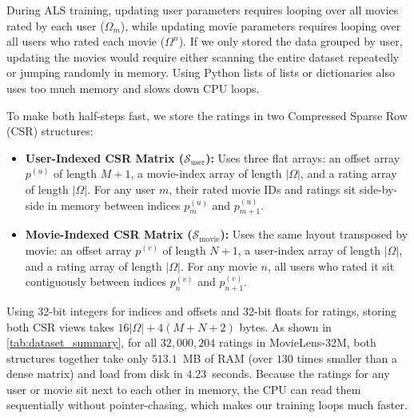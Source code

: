 \documentclass{article}
\theoremstyle{plain}
\theoremstyle{definition}
\begin{document}
During ALS training, updating user parameters requires looping over all movies rated by each user ($\Omega_m$), while updating movie parameters requires looping over all users who rated each movie ($\Omega^n$). If we only stored the data grouped by user, updating the movies would require either scanning the entire dataset repeatedly or jumping randomly in memory. Using Python lists of lists or dictionaries also uses too much memory and slows down CPU loops.

To make both half-steps fast, we store the ratings in two Compressed Sparse Row (CSR) structures:
\begin{itemize}
    \item \textbf{User-Indexed CSR Matrix ($\mathcal{S}_{\text{user}}$):} Uses three flat arrays: an offset array $p^{(u)}$ of length $M+1$, a movie-index array of length $|\Omega|$, and a rating array of length $|\Omega|$. For any user $m$, their rated movie IDs and ratings sit side-by-side in memory between indices $p^{(u)}_m$ and $p^{(u)}_{m+1}$.
    \item \textbf{Movie-Indexed CSR Matrix ($\mathcal{S}_{\text{movie}}$):} Uses the same layout transposed by movie: an offset array $p^{(v)}$ of length $N+1$, a user-index array of length $|\Omega|$, and a rating array of length $|\Omega|$. For any movie $n$, all users who rated it sit contiguously between indices $p^{(v)}_n$ and $p^{(v)}_{n+1}$.
\end{itemize}
Using 32-bit integers for indices and offsets and 32-bit floats for ratings, storing both CSR views takes $16|\Omega| + 4(M+N+2)$ bytes. As shown in \cref{tab:dataset_summary}, for all $32{,}000{,}204$ ratings in MovieLens-32M, both structures together take only $513.1$~MB of RAM (over $130$ times smaller than a dense matrix) and load from disk in $4.23$~seconds. Because the ratings for any user or movie sit next to each other in memory, the CPU can read them sequentially without pointer-chasing, which makes our training loops much faster.
\end{document}
